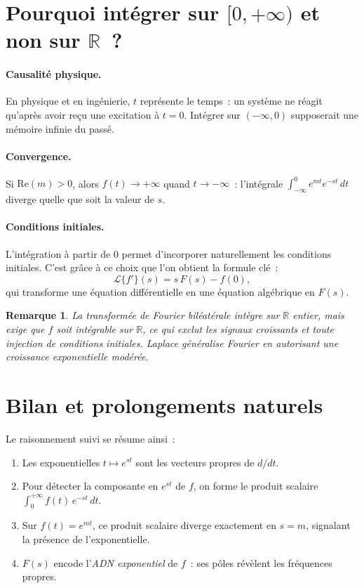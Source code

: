 \documentclass[11pt, a4paper]{article}
\theoremstyle{plain_style}
\newtheorem{remarque}{Remarque}
\begin{document}
\section{Pourquoi int\'{e}grer sur \texorpdfstring{$[0,+\infty)$}{[0, +infini)} et non sur \texorpdfstring{$\mathbb{R}$}{R}~?}
\paragraph{Causalit\'{e} physique.}
En physique et en ing\'{e}nierie, $t$ repr\'{e}sente le temps~: un syst\`{e}me ne r\'{e}agit
qu'apr\`{e}s avoir re\c{c}u une excitation \`{a} $t = 0$. Int\'{e}grer sur $(-\infty, 0)$
supposerait une m\'{e}moire infinie du pass\'{e}.

\paragraph{Convergence.}
Si $\mathrm{Re}(m) > 0$, alors $f(t) \to +\infty$ quand $t \to -\infty$~:
l'int\'{e}grale $\int_{-\infty}^{0} e^{mt} e^{-st}\,dt$ diverge quelle que soit la valeur de $s$.

\paragraph{Conditions initiales.}
L'int\'{e}gration \`{a} partir de $0$ permet d'incorporer naturellement les conditions
initiales. C'est gr\^{a}ce \`{a} ce choix que l'on obtient la formule cl\'{e}~:
\[
  \mathcal{L}\{f'\}(s) = s\,F(s) - f(0),
\]
qui transforme une \'{e}quation diff\'{e}rentielle en une \'{e}quation alg\'{e}brique en $F(s)$.

\begin{remarque}
La transform\'{e}e de Fourier bil\'{e}at\'{e}rale int\`{e}gre sur $\mathbb{R}$ entier, mais
exige que $f$ soit int\'{e}grable sur $\mathbb{R}$, ce qui exclut les signaux croissants et
toute injection de conditions initiales. Laplace g\'{e}n\'{e}ralise Fourier en autorisant une
croissance exponentielle mod\'{e}r\'{e}e.
\end{remarque}

\section{Bilan et prolongements naturels}

Le raisonnement suivi se r\'{e}sume ainsi~:
\begin{enumerate}
  \item Les exponentielles $t \mapsto e^{st}$ sont les vecteurs propres de $d/dt$.
  \item Pour d\'{e}tecter la composante en $e^{st}$ de $f$, on forme le produit scalaire
        $\displaystyle\int_0^{+\infty} f(t)\,e^{-st}\,dt$.
  \item Sur $f(t) = e^{mt}$, ce produit scalaire diverge exactement en $s = m$,
        signalant la pr\'{e}sence de l'exponentielle.
  \item $F(s)$ encode l'\emph{ADN exponentiel} de $f$~: ses p\^{o}les r\'{e}v\`{e}lent
        les fr\'{e}quences propres.
\end{enumerate}
\end{document}
